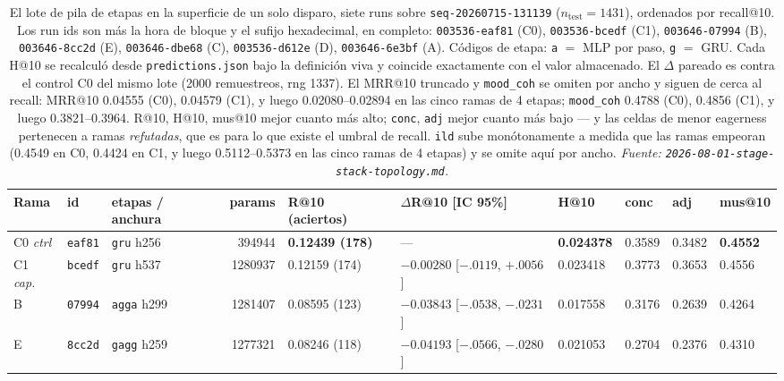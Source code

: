 \documentclass[11pt]{article}
\newcommand{\runid}[1]{\texttt{\small\seqsplit{#1}}}
\newcommand{\dsid}[1]{\texttt{\small #1}}
\newcommand{\best}[1]{\textbf{#1}}
\begin{document}
\begin{table}[ht]
  \centering
  \caption{El lote de pila de etapas en la superficie de un solo disparo, siete
  runs sobre \dsid{seq-20260715-131139}
  ($n_{\mathrm{test}}=\num{1431}$), ordenados por recall@10. Los run ids son
  \protect\runid{run-20260801-} más la hora de bloque y el sufijo hexadecimal, en
  completo: \texttt{003536-eaf81} (C0), \texttt{003536-bcedf} (C1),
  \texttt{003646-07994} (B), \texttt{003646-8cc2d} (E), \texttt{003646-dbe68} (C),
  \texttt{003536-d612e} (D), \texttt{003646-6e3bf} (A). Códigos de etapa:
  \texttt{a} $=$ MLP por paso, \texttt{g} $=$ GRU. Cada H@10 se recalculó desde
  \texttt{predictions.json} bajo la definición viva y coincide exactamente con el
  valor almacenado. El $\Delta$ pareado es contra el control C0 del mismo lote
  (\num{2000} remuestreos, rng \num{1337}). El MRR@10 truncado y
  \texttt{mood\_coh} se omiten por ancho y siguen de cerca al recall: MRR@10
  \num{0.04555} (C0), \num{0.04579} (C1), y luego
  \numrange{0.02080}{0.02894} en las cinco ramas de 4 etapas;
  \texttt{mood\_coh} \num{0.4788} (C0), \num{0.4856} (C1), y luego
  \numrange{0.3821}{0.3964}. R@10, H@10, mus@10 mejor cuanto más alto;
  \texttt{conc}, \texttt{adj} mejor cuanto más bajo --- y las celdas de menor
  eagerness pertenecen a ramas \emph{refutadas}, que es para lo que existe el
  umbral de recall. \texttt{ild} sube monótonamente a medida que las ramas empeoran
  (\num{0.4549} en C0, \num{0.4424} en C1, y luego
  \numrange{0.5112}{0.5373} en las cinco ramas de 4 etapas) y se omite aquí por
  ancho.
  \emph{Fuente: \texttt{2026-08-01-stage-stack-topology.md}.}}
  \label{tab:stagestack-s1}
  {\scriptsize\setlength{\tabcolsep}{2.0pt}\begin{tabular}{lllrllllll}
    \toprule
    Rama & id & etapas / anchura & params & R@10 (aciertos) & $\Delta$R@10 [IC 95\%] & H@10 & conc & adj & mus@10 \\
    \midrule
    C0 \emph{ctrl} & \texttt{eaf81} & \texttt{gru} h256 & \num{394944} & \best{0.12439 (178)} & --- & \best{0.024378} & 0.3589 & 0.3482 & \best{0.4552} \\
    C1 \emph{cap.} & \texttt{bcedf} & \texttt{gru} h537 & \num{1280937} & 0.12159 (174) & $-0.00280$ [$-.0119$, $+.0056$] & 0.023418 & 0.3773 & 0.3653 & 0.4556 \\
    B & \texttt{07994} & \texttt{agga} h299 & \num{1281407} & 0.08595 (123) & $-0.03843$ [$-.0538$, $-.0231$] & 0.017558 & 0.3176 & 0.2639 & 0.4264 \\
    E & \texttt{8cc2d} & \texttt{gagg} h259 & \num{1277321} & 0.08246 (118) & $-0.04193$ [$-.0566$, $-.0280$] & 0.021053 & 0.2704 & 0.2376 & 0.4310 \\

\end{tabular}}
\end{table}
\end{document}
